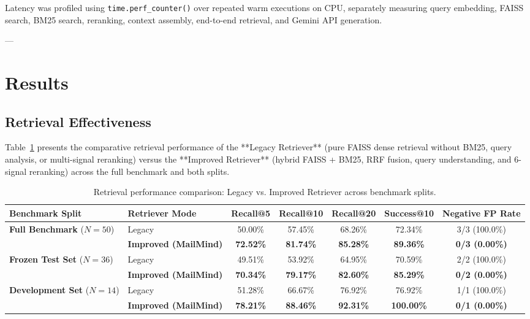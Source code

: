 \documentclass[11pt,a4paper]{article}
\begin{document}
Latency was profiled using \texttt{time.perf_counter()} over repeated warm executions on CPU, separately measuring query embedding, FAISS search, BM25 search, reranking, context assembly, end-to-end retrieval, and Gemini API generation.

---

\section{Results}

\subsection{Retrieval Effectiveness}
Table~\ref{tab:retrieval_results} presents the comparative retrieval performance of the **Legacy Retriever** (pure FAISS dense retrieval without BM25, query analysis, or multi-signal reranking) versus the **Improved Retriever** (hybrid FAISS + BM25, RRF fusion, query understanding, and 6-signal reranking) across the full benchmark and both splits.

\begin{table}[t]
\centering
\small
\caption{Retrieval performance comparison: Legacy vs. Improved Retriever across benchmark splits.}
\label{tab:retrieval_results}
\begin{tabularx}{\textwidth}{l l c c c c c}
\toprule
\textbf{Benchmark Split} & \textbf{Retriever Mode} & \textbf{Recall@5} & \textbf{Recall@10} & \textbf{Recall@20} & \textbf{Success@10} & \textbf{Negative FP Rate} \\
\midrule
\multirow{2}{*}{\textbf{Full Benchmark} ($N=50$)} & Legacy & 50.00\% & 57.45\% & 68.26\% & 72.34\% & 3/3 (100.0\%) \\
& \textbf{Improved (MailMind)} & \textbf{72.52\%} & \textbf{81.74\%} & \textbf{85.28\%} & \textbf{89.36\%} & \textbf{0/3 (0.00\%)} \\
\midrule
\multirow{2}{*}{\textbf{Frozen Test Set} ($N=36$)} & Legacy & 49.51\% & 53.92\% & 64.95\% & 70.59\% & 2/2 (100.0\%) \\
& \textbf{Improved (MailMind)} & \textbf{70.34\%} & \textbf{79.17\%} & \textbf{82.60\%} & \textbf{85.29\%} & \textbf{0/2 (0.00\%)} \\
\midrule
\multirow{2}{*}{\textbf{Development Set} ($N=14$)} & Legacy & 51.28\% & 66.67\% & 76.92\% & 76.92\% & 1/1 (100.0\%) \\
& \textbf{Improved (MailMind)} & \textbf{78.21\%} & \textbf{88.46\%} & \textbf{92.31\%} & \textbf{100.00\%} & \textbf{0/1 (0.00\%)} \\
\bottomrule
\end{tabularx}
\end{table}
\end{document}
